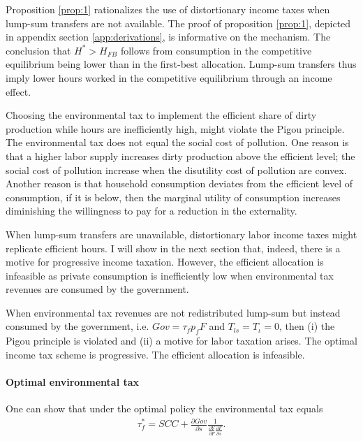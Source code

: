 
Proposition \ref{prop:1} rationalizes the use of distortionary income taxes when lump-sum transfers are not available.
The proof of proposition \ref{prop:1}, depicted in appendix section \ref{app:derivations}, is informative on the mechanism. The conclusion that $H^*>H_{FB}$ follows from consumption in the competitive equilibrium being lower than in the first-best allocation. Lump-sum transfers thus imply lower hours worked in the competitive equilibrium through an income effect.

Choosing the environmental tax to implement the efficient share of dirty production while hours are inefficiently high, might  violate the Pigou principle. The environmental tax does not equal the social cost of pollution. One reason is that a higher labor supply increases dirty production above the efficient level; the social cost of pollution increase when the disutility cost of pollution are convex. Another reason is that household consumption deviates from the efficient level of consumption, if it is below, then the marginal utility of consumption increases diminishing the willingness to pay for a reduction in the externality. 


When lump-sum transfers are unavailable, distortionary labor income taxes might replicate efficient hours. I will show in the next section that, indeed, there is a motive for progressive income taxation. However, the efficient allocation is infeasible as private consumption is inefficiently low when environmental tax revenues are consumed by the government. 


\begin{prop}\label{prop:2}
When environmental tax revenues are not redistributed lump-sum but instead consumed by the government, i.e. $Gov=\tau_fp_fF$ and $T_{ls}=T_\iota=0$, then (i) the Pigou principle is violated and (ii) a motive for labor taxation arises. The optimal income tax scheme is progressive. %
The efficient allocation is infeasible.  
\end{prop}

\paragraph{Optimal environmental tax}
One can show that under the optimal policy the environmental tax equals
	\begin{align}
\tau_{f}^*= SCC+\frac{\partial Gov}{\partial s}\frac{1}{\frac{\partial Y}{\partial F}\frac{\partial F}{\partial s}}.
\end{align}

